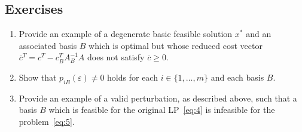 




\subsection*{Exercises}

\begin{enumerate}
\item Provide an example of a degenerate basic feasible solution $x^*$
  and an associated basis $B$ which is optimal but whose reduced cost
  vector $\overline{c}^T =c^T - c_B^T A_B^{-1}A$ does not satisfy
  $\overline{c}\geq0$.\label{item:10} 
\item Show that  $p_{iB}(\varepsilon)\neq 0$ holds for each $i\in \{1,\ldots,m\}$ and
  each basis $B$. \label{item:14}
\item Provide an example of a valid perturbation, as described above,
  such that a basis $B$ which is feasible for the original
  LP~\eqref{eq:4} is infeasible for the problem~\eqref{eq:5}. 
  \label{item:15} 
\end{enumerate}










